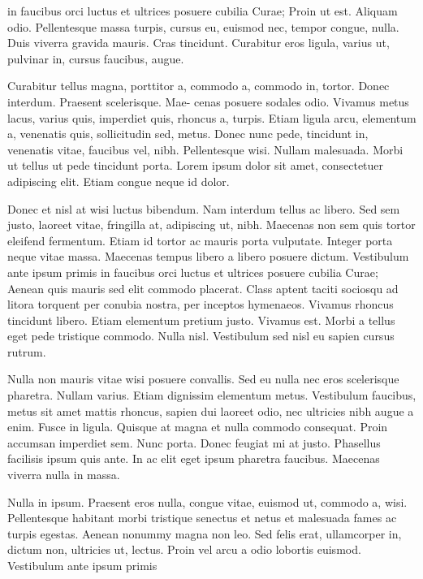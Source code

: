 \documentclass[AMA,STIX1COL]{WileyNJD-SP}
\begin{document}
in faucibus orci luctus et ultrices posuere cubilia Curae; Proin ut est. Aliquam odio. Pellentesque massa turpis, cursus
eu, euismod nec, tempor congue, nulla. Duis viverra gravida mauris. Cras tincidunt. Curabitur eros ligula, varius ut,
pulvinar in, cursus faucibus, augue.

Curabitur tellus magna, porttitor a, commodo a, commodo in, tortor. Donec interdum. Praesent scelerisque. Mae-
cenas posuere sodales odio. Vivamus metus lacus, varius quis, imperdiet quis, rhoncus a, turpis. Etiam ligula arcu,
elementum a, venenatis quis, sollicitudin sed, metus. Donec nunc pede, tincidunt in, venenatis vitae, faucibus vel,
nibh. Pellentesque wisi. Nullam malesuada. Morbi ut tellus ut pede tincidunt porta. Lorem ipsum dolor sit amet,
consectetuer adipiscing elit. Etiam congue neque id dolor.

Donec et nisl at wisi luctus bibendum. Nam interdum tellus ac libero. Sed sem justo, laoreet vitae, fringilla at,
adipiscing ut, nibh. Maecenas non sem quis tortor eleifend fermentum. Etiam id tortor ac mauris porta vulputate.
Integer porta neque vitae massa. Maecenas tempus libero a libero posuere dictum. Vestibulum ante ipsum primis in
faucibus orci luctus et ultrices posuere cubilia Curae; Aenean quis mauris sed elit commodo placerat. Class aptent
taciti sociosqu ad litora torquent per conubia nostra, per inceptos hymenaeos. Vivamus rhoncus tincidunt libero.
Etiam elementum pretium justo. Vivamus est. Morbi a tellus eget pede tristique commodo. Nulla nisl. Vestibulum
sed nisl eu sapien cursus rutrum.

Nulla non mauris vitae wisi posuere convallis. Sed eu nulla nec eros scelerisque pharetra. Nullam varius. Etiam
dignissim elementum metus. Vestibulum faucibus, metus sit amet mattis rhoncus, sapien dui laoreet odio, nec ultricies
nibh augue a enim. Fusce in ligula. Quisque at magna et nulla commodo consequat. Proin accumsan imperdiet sem.
Nunc porta. Donec feugiat mi at justo. Phasellus facilisis ipsum quis ante. In ac elit eget ipsum pharetra faucibus.
Maecenas viverra nulla in massa.

Nulla in ipsum. Praesent eros nulla, congue vitae, euismod ut, commodo a, wisi. Pellentesque habitant morbi
tristique senectus et netus et malesuada fames ac turpis egestas. Aenean nonummy magna non leo. Sed felis erat,
ullamcorper in, dictum non, ultricies ut, lectus. Proin vel arcu a odio lobortis euismod. Vestibulum ante ipsum primis
\end{document}
